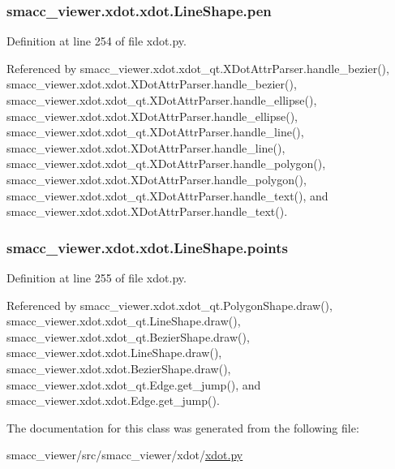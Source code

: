\subsubsection[{\texorpdfstring{pen}{pen}}]{\setlength{\rightskip}{0pt plus 5cm}smacc\+\_\+viewer.\+xdot.\+xdot.\+Line\+Shape.\+pen}\hypertarget{classsmacc__viewer_1_1xdot_1_1xdot_1_1LineShape_a16342608ce6256e5d6d51a84c03bf233}{}\label{classsmacc__viewer_1_1xdot_1_1xdot_1_1LineShape_a16342608ce6256e5d6d51a84c03bf233}


Definition at line 254 of file xdot.\+py.



Referenced by smacc\+\_\+viewer.\+xdot.\+xdot\+\_\+qt.\+X\+Dot\+Attr\+Parser.\+handle\+\_\+bezier(), smacc\+\_\+viewer.\+xdot.\+xdot.\+X\+Dot\+Attr\+Parser.\+handle\+\_\+bezier(), smacc\+\_\+viewer.\+xdot.\+xdot\+\_\+qt.\+X\+Dot\+Attr\+Parser.\+handle\+\_\+ellipse(), smacc\+\_\+viewer.\+xdot.\+xdot.\+X\+Dot\+Attr\+Parser.\+handle\+\_\+ellipse(), smacc\+\_\+viewer.\+xdot.\+xdot\+\_\+qt.\+X\+Dot\+Attr\+Parser.\+handle\+\_\+line(), smacc\+\_\+viewer.\+xdot.\+xdot.\+X\+Dot\+Attr\+Parser.\+handle\+\_\+line(), smacc\+\_\+viewer.\+xdot.\+xdot\+\_\+qt.\+X\+Dot\+Attr\+Parser.\+handle\+\_\+polygon(), smacc\+\_\+viewer.\+xdot.\+xdot.\+X\+Dot\+Attr\+Parser.\+handle\+\_\+polygon(), smacc\+\_\+viewer.\+xdot.\+xdot\+\_\+qt.\+X\+Dot\+Attr\+Parser.\+handle\+\_\+text(), and smacc\+\_\+viewer.\+xdot.\+xdot.\+X\+Dot\+Attr\+Parser.\+handle\+\_\+text().

\subsubsection[{\texorpdfstring{points}{points}}]{\setlength{\rightskip}{0pt plus 5cm}smacc\+\_\+viewer.\+xdot.\+xdot.\+Line\+Shape.\+points}\hypertarget{classsmacc__viewer_1_1xdot_1_1xdot_1_1LineShape_a68e8fd028bbfa9bb1dfd04fa96400d39}{}\label{classsmacc__viewer_1_1xdot_1_1xdot_1_1LineShape_a68e8fd028bbfa9bb1dfd04fa96400d39}


Definition at line 255 of file xdot.\+py.



Referenced by smacc\+\_\+viewer.\+xdot.\+xdot\+\_\+qt.\+Polygon\+Shape.\+draw(), smacc\+\_\+viewer.\+xdot.\+xdot\+\_\+qt.\+Line\+Shape.\+draw(), smacc\+\_\+viewer.\+xdot.\+xdot\+\_\+qt.\+Bezier\+Shape.\+draw(), smacc\+\_\+viewer.\+xdot.\+xdot.\+Line\+Shape.\+draw(), smacc\+\_\+viewer.\+xdot.\+xdot.\+Bezier\+Shape.\+draw(), smacc\+\_\+viewer.\+xdot.\+xdot\+\_\+qt.\+Edge.\+get\+\_\+jump(), and smacc\+\_\+viewer.\+xdot.\+xdot.\+Edge.\+get\+\_\+jump().



The documentation for this class was generated from the following file\+:\begin{DoxyCompactItemize}
\item 
smacc\+\_\+viewer/src/smacc\+\_\+viewer/xdot/\hyperlink{xdot_8py}{xdot.\+py}\end{DoxyCompactItemize}
